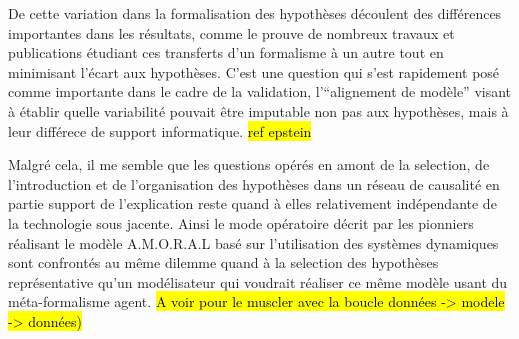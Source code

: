 De cette variation dans la formalisation des hypothèses découlent des différences importantes dans les résultats, comme le prouve de nombreux travaux et publications étudiant ces transferts d'un formalisme à un autre tout en minimisant l'écart aux hypothèses. C'est une question qui s'est rapidement posé comme importante dans le cadre de la validation, l'\enquote{alignement de modèle} visant à établir quelle variabilité pouvait être imputable non pas aux hypothèses, mais à leur différece de support informatique. \hl{ref epstein}

Malgré cela, il me semble que les questions opérés en amont de la selection, de l'introduction et de l'organisation des hypothèses dans un réseau de causalité en partie support de l'explication reste quand à elles relativement indépendante de la technologie sous jacente. Ainsi le mode opératoire décrit par les pionniers réalisant le modèle A.M.O.R.A.L basé sur l'utilisation des systèmes dynamiques sont confrontés au même dilemme quand à la selection des hypothèses représentative qu'un modélisateur qui voudrait réaliser ce même modèle usant du méta-formalisme agent. \hl{A voir pour le muscler avec la boucle données -> modele -> données)}








